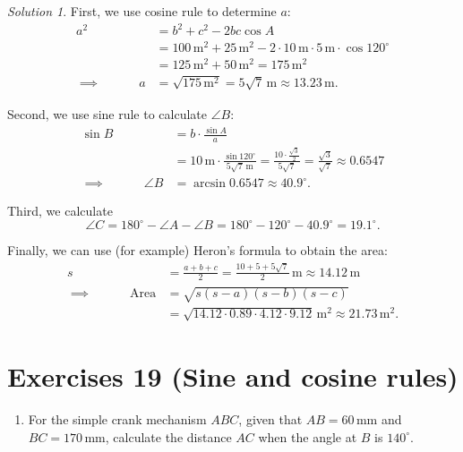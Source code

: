 \documentclass[
  12pt,
  oneside]{book}
\providecommand{\tightlist}{%
  \setlength{\itemsep}{0pt}\setlength{\parskip}{0pt}}
\theoremstyle{definition}
\theoremstyle{definition}
\theoremstyle{definition}
\theoremstyle{definition}
\theoremstyle{remark}
\newtheorem*{solution}{Solution}
\begin{document}
\begin{solution}
First, we use cosine rule to determine \(a\):
\begin{align*}
a^2 &= b^2+c^2-2bc\cos A\\
&= 100\,\mathrm{m^2} + 25 \,\mathrm{m^2} - 2\cdot 10\,\mathrm{m}\cdot 5\,\mathrm{m}\cdot \cos 120^\circ\\
&= 125\,\mathrm{m^2} + 50 \,\mathrm{m^2} = 175 \,\mathrm{m^2}\\
\implies\quad\quad\quad a &= \sqrt{175\,\mathrm{m^2}} =5\sqrt{7}\,\mathrm{m} \approx 13.23\,\mathrm{m}.
\end{align*}

Second, we use sine rule to calculate \(\angle B\):
\begin{align*}
\sin B &= b\cdot\frac{\sin A}{a}\\
&= 10\,\mathrm{m}\cdot \frac{\sin 120^\circ}{5\sqrt{7}\,\mathrm{m}} = \frac{10\cdot \frac{\sqrt{3}}{2}}{5\sqrt{7}} =\frac{\sqrt{3}}{\sqrt{7}}\approx 0.6547\\
\implies\quad\quad\quad \angle B &= \arcsin 0.6547 \approx 40.9^\circ.
\end{align*}

Third, we calculate
\[
\angle C = 180^\circ - \angle A-\angle B = 180^\circ- 120^\circ - 40.9^\circ = 19.1^\circ.
\]

Finally, we can use (for example) Heron's formula to obtain the area:
\begin{align*}
s &= \frac{a+b+c}{2} = \frac{10+5+5\sqrt{7}}{2}\,\mathrm{m} \approx 14.12\,\mathrm{m}\\
\implies\quad\quad\quad \mathrm{Area} &= 
\sqrt{s(s-a)(s-b)(s-c)}\\
&=\sqrt{14.12\cdot 0.89\cdot 4.12\cdot 9.12} \,\mathrm{m^2} \approx 21.73\,\mathrm{m^2}.
\end{align*}
\end{solution}

\hypertarget{exercises-19-sine-and-cosine-rules}{%
\chapter*{Exercises 19 (Sine and cosine rules)}\label{exercises-19-sine-and-cosine-rules}}

\begin{enumerate}
\def\labelenumi{\arabic{enumi}.}
\tightlist
\item
  For the simple crank mechanism \(ABC\), given that \(AB = 60\,\mathrm{mm}\) and \(BC = 170\,\mathrm{mm}\), calculate the distance \(AC\) when the angle at \(B\) is \(140^\circ\).
\end{enumerate}
\end{document}
